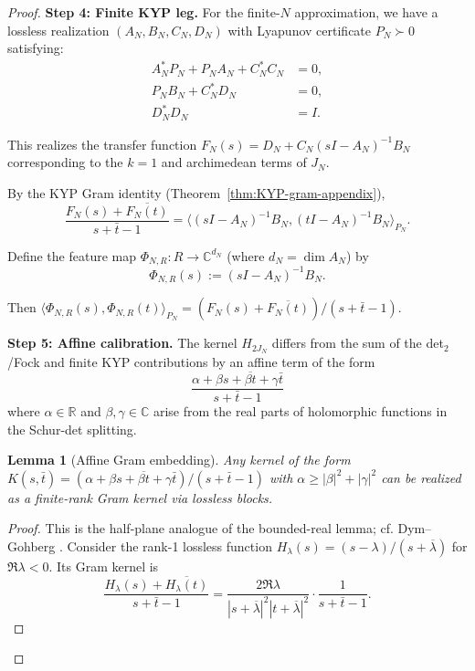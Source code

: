 \documentclass[11pt]{article}
\newtheorem{lemma}[theorem]{Lemma}
\theoremstyle{definition}
\theoremstyle{remark}
\begin{document}
\begin{proof}
\medskip
\noindent\textbf{Step 4: Finite KYP leg.}
For the finite-$N$ approximation, we have a lossless realization $(A_N, B_N, C_N, D_N)$ with Lyapunov certificate $P_N \succ 0$ satisfying:
\begin{align}
  A_N^* P_N + P_N A_N + C_N^* C_N &= 0,\\
  P_N B_N + C_N^* D_N &= 0,\\
  D_N^* D_N &= I.
\end{align}

This realizes the transfer function $F_N(s) = D_N + C_N(sI - A_N)^{-1}B_N$ corresponding to the $k=1$ and archimedean terms of $J_N$.

By the KYP Gram identity (Theorem~\ref{thm:KYP-gram-appendix}),
\[
  \frac{F_N(s) + \overline{F_N(t)}}{s + \bar t - 1} = \langle (sI - A_N)^{-1}B_N, (tI - A_N)^{-1}B_N \rangle_{P_N}.
\]

Define the feature map $\Phi_{N,R}: R \to \mathbb{C}^{d_N}$ (where $d_N = \dim A_N$) by
\[
  \Phi_{N,R}(s) := (sI - A_N)^{-1}B_N.
\]

Then $\langle \Phi_{N,R}(s), \Phi_{N,R}(t) \rangle_{P_N} = (F_N(s) + \overline{F_N(t)})/(s + \bar t - 1)$.

\medskip
\noindent\textbf{Step 5: Affine calibration.}
The kernel $H_{2J_N}$ differs from the sum of the det$_2$/Fock and finite KYP contributions by an affine term of the form
\[
  \frac{\alpha + \beta s + \overline{\beta t} + \gamma \bar t}{s + \bar t - 1}
\]
where $\alpha \in \mathbb{R}$ and $\beta, \gamma \in \mathbb{C}$ arise from the real parts of holomorphic functions in the Schur-det splitting.

\begin{lemma}[Affine Gram embedding]\label{lem:affine-gram-embedding}
Any kernel of the form $K(s,\bar t) = (\alpha + \beta s + \overline{\beta t} + \gamma \bar t)/(s + \bar t - 1)$ with $\alpha \geq |\beta|^2 + |\gamma|^2$ can be realized as a finite-rank Gram kernel via lossless blocks.
\end{lemma}

\begin{proof}
This is the half-plane analogue of the bounded-real lemma; cf. Dym--Gohberg \cite[Ch.~3]{DymGohberg}.
Consider the rank-1 lossless function $H_\lambda(s) = (s - \lambda)/(s + \overline{\lambda})$ for $\Re \lambda < 0$. Its Gram kernel is
\[
  \frac{H_\lambda(s) + \overline{H_\lambda(t)}}{s + \bar t - 1} = \frac{2\Re \lambda}{|s + \overline{\lambda}|^2 |t + \overline{\lambda}|^2} \cdot \frac{1}{s + \bar t - 1}.
\]


\end{proof}
\end{proof}
\end{document}
